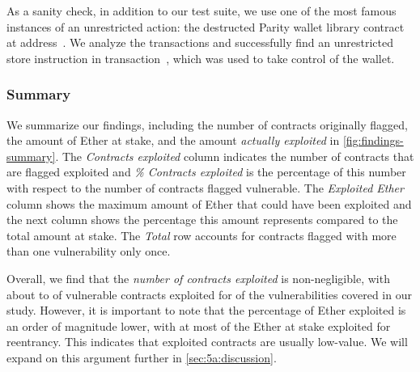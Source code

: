  As a sanity check, in addition to our test suite, we use one of the most famous instances of an unrestricted action: the destructed Parity wallet library contract at address~. We analyze the transactions and successfully find an unrestricted store instruction in transaction~, which was used to take control of the wallet.

\subsubsection{Summary}
We summarize our findings, including the number of contracts originally flagged, the amount of Ether at stake, and the amount \emph{actually exploited} in \autoref{fig:findings-summary}. The \emph{Contracts exploited} column indicates the number of contracts that are flagged exploited and \emph{\% Contracts exploited} is the percentage of this number with respect to the number of contracts flagged vulnerable. The \emph{Exploited Ether} column shows the maximum amount of Ether that could have been exploited and the next column shows the percentage this amount represents compared to the total amount at stake. The \emph{Total} row accounts for contracts flagged with more than one vulnerability only once.

Overall, we find that the \emph{number of contracts exploited} is non-negligible, with about  to  of vulnerable contracts exploited for  of the \VulnTypesNum vulnerabilities covered in our study.
However, it is important to note that the percentage of Ether exploited is an order of magnitude lower, with at most  of the Ether at stake exploited for reentrancy.
This indicates that exploited contracts are usually low-value.
We will expand on this argument further in \autoref{sec:5a:discussion}.



